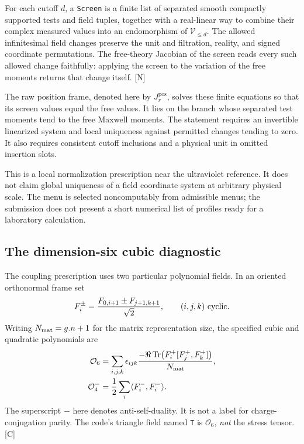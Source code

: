 \documentclass[11pt]{article}
\newcommand{\code}[1]{{\small\nolinkurl{#1}}}
\newcommand{\src}[1]{\textsf{[#1]}}
\newcommand{\cO}{\mathcal O}
\begin{document}
For each cutoff $d$, a \code{Screen} is a finite list of separated smooth
compactly supported tests and field tuples, together with a real-linear
way to combine their complex measured values into an endomorphism of
$\mathcal V_{\le d}$. The allowed infinitesimal field changes preserve
the unit and filtration, reality, and signed coordinate permutations.
The free-theory Jacobian of the screen reads every such allowed change
faithfully: applying the screen to the variation of the free moments
returns that change itself. \src{N}

The raw position frame, denoted here by $J_r^{\mathrm{pos}}$, solves
these finite equations so that its screen values equal the free values.
It lies on the branch whose separated test moments tend to the free
Maxwell moments. The statement requires an invertible linearized system
and local uniqueness against permitted changes tending to zero. It
also requires consistent cutoff inclusions and a physical unit in
omitted insertion slots.

This is a local normalization prescription near the ultraviolet
reference. It does not claim global uniqueness of a field coordinate
system at arbitrary physical scale. The menu is selected
noncomputably from admissible menus; the submission does not present
a short numerical list of profiles ready for a laboratory calculation.

\subsection{The dimension-six cubic diagnostic}

The coupling prescription uses two particular polynomial fields.
In an oriented orthonormal frame set
\[
 F_i^{\pm}=\frac{F_{0,i+1}\pm F_{j+1,k+1}}{\sqrt2},
 \qquad(i,j,k)\ \hbox{cyclic}.
\]
Writing $N_{\rm mat}=g.n+1$ for the matrix representation size, the
specified cubic and quadratic polynomials are
\begin{align}
 \cO_6&=\sum_{i,j,k}\epsilon_{ijk}
       \frac{-\Re\operatorname{Tr}\bigl(F_i^+[F_j^+,F_k^+]\bigr)}{N_{\rm mat}},
       \label{eq:dim6}\\
 \cO_4^-&=\frac12\sum_i\langle F_i^-,F_i^-\rangle.
       \label{eq:dim4}
\end{align}
The superscript $-$ here denotes anti-self-duality. It is not a label
for charge-conjugation parity. The code's triangle field named
\code{T} is $\cO_6$, \emph{not} the stress tensor. \src{C}
\end{document}
